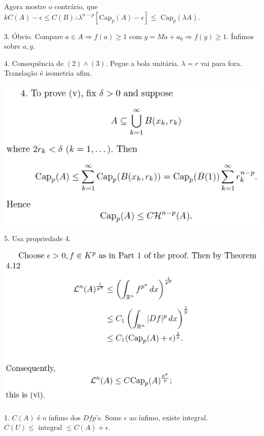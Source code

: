 \documentclass[12pt]{article}
\begin{document}
Agora mostre o contr\'ario, que $k C(A) - \epsilon \le C(B) \therefore \lambda^{n - p} [\text{Cap}_p(A) - \epsilon] \le \text{ Cap}_p(\lambda A)$.

3. \'Obvio. Compare $a\in A \Rightarrow f(a) \ge 1$ com $y = Ma + a_0 \Rightarrow f(y) \ge 1$. \'Infimos sobre $a,y$.

4. Consequ\^encia de $(2)\wedge (3)$. Pegue a bola unit\'aria. $\lambda = r$ vai para fora. Transla\c{c}\~ao \'e isometria afim.

\vspace{300mm}

		\begin{center}
		\includegraphics{12}
		\end{center}

5. Usa propriedade 4.

\vspace{300mm}

		\begin{center}
		\includegraphics{12b}
		\end{center}

1. $C(A)$ \'e o \'infimo dos $Dfp$'s. Some $\epsilon$ ao \'infimo, existe integral. $C(U) \le \text{ integral }\le C(A) + \epsilon$.
\end{document}
